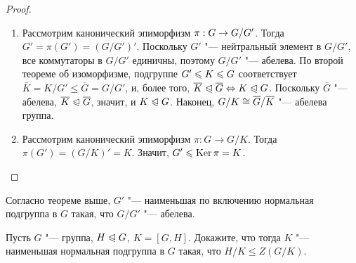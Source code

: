 \begin{proof}~
	\begin{enumerate}
		\item Рассмотрим канонический эпиморфизм $\pi: G \hm\to G / G'$. Тогда $G' = \pi(G') = (G / G')'$. Поскольку $G'$ "--- нейтральный элемент в $G / G'$, все коммутаторы в $G / G'$ единичны, поэтому $G / G'$ "--- абелева. По второй теореме об изоморфизме, подгруппе $G' \hm\le K \le G$ соответствует $\overline{K} = K / G' \le \overline{G} = G / G'$, и, более того, $\overline{K} \trianglelefteqslant \overline{G} \Leftrightarrow K \trianglelefteqslant G$. Поскольку $\overline{G}$ "--- абелева, $\overline{K} \trianglelefteqslant \overline{G}$, значит, и $K \trianglelefteqslant G$. Наконец, $G / K \hm\cong \overline{G} / \overline{K}$ "--- абелева группа.
		
		\item Рассмотрим канонический эпиморфизм $\pi: G \to G / K$. Тогда $\pi(G') = (G / K)' = K$. Значит, $G' \leqslant \operatorname{Ker}\pi = K$.
	\end{enumerate}
\end{proof}

\begin{note}
	Согласно теореме выше, $G'$ "--- наименьшая по включению нормальная подгруппа в $G$ такая, что $G / G'$ "--- абелева.
\end{note}

\begin{exercise}
	Пусть $G$ "--- группа, $H \trianglelefteqslant G$, $K = [G, H]$. Докажите, что тогда $K$ "--- наименьшая нормальная подгруппа в $G$ такая, что $H / K \le Z (G / K)$.
\end{exercise}